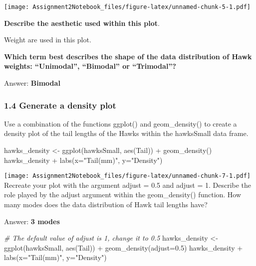 \documentclass[
]{article}
\newenvironment{Shaded}{\begin{snugshade}}{\end{snugshade}}
\newcommand{\AttributeTok}[1]{\textcolor[rgb]{0.77,0.63,0.00}{#1}}
\newcommand{\CommentTok}[1]{\textcolor[rgb]{0.56,0.35,0.01}{\textit{#1}}}
\newcommand{\FloatTok}[1]{\textcolor[rgb]{0.00,0.00,0.81}{#1}}
\newcommand{\FunctionTok}[1]{\textcolor[rgb]{0.00,0.00,0.00}{#1}}
\newcommand{\NormalTok}[1]{#1}
\newcommand{\OtherTok}[1]{\textcolor[rgb]{0.56,0.35,0.01}{#1}}
\newcommand{\SpecialCharTok}[1]{\textcolor[rgb]{0.00,0.00,0.00}{#1}}
\newcommand{\StringTok}[1]{\textcolor[rgb]{0.31,0.60,0.02}{#1}}
\begin{document}
\texttt{[image: Assignment2Notebook\_files/figure-latex/unnamed-chunk-5-1.pdf]}

\textbf{Describe the aesthetic used within this plot}.

Weight are used in this plot.

\textbf{Which term best describes the shape of the data distribution of
Hawk weights: ``Unimodal'', ``Bimodal'' or ``Trimodal''?}

Answer: \textbf{Bimodal}

\hypertarget{generate-a-density-plot}{%
\subsubsection{1.4 Generate a density
plot}\label{generate-a-density-plot}}

Use a combination of the functions ggplot() and geom\_density() to
create a density plot of the tail lengths of the Hawks within the
hawksSmall data frame.

\begin{Shaded}
\begin{Highlighting}[]
\NormalTok{hawks\_density }\OtherTok{\textless{}{-}} \FunctionTok{ggplot}\NormalTok{(hawksSmall, }\FunctionTok{aes}\NormalTok{(Tail)) }\SpecialCharTok{+} \FunctionTok{geom\_density}\NormalTok{()}
\NormalTok{hawks\_density }\SpecialCharTok{+} \FunctionTok{labs}\NormalTok{(}\AttributeTok{x=}\StringTok{"Tail(mm)"}\NormalTok{, }\AttributeTok{y=}\StringTok{"Density"}\NormalTok{)}
\end{Highlighting}
\end{Shaded}

\texttt{[image: Assignment2Notebook\_files/figure-latex/unnamed-chunk-7-1.pdf]}
Recreate your plot with the argument adjust = 0.5 and adjust = 1.
Describe the role played by the adjust argument within the
geom\_density() function. How many modes does the data distribution of
Hawk tail lengths have?

Answer: \textbf{3 modes}

\begin{Shaded}
\begin{Highlighting}[]
\CommentTok{\# The default value of adjust is 1, change it to 0.5}
\NormalTok{hawks\_density }\OtherTok{\textless{}{-}} \FunctionTok{ggplot}\NormalTok{(hawksSmall, }\FunctionTok{aes}\NormalTok{(Tail)) }\SpecialCharTok{+} \FunctionTok{geom\_density}\NormalTok{(}\AttributeTok{adjust=}\FloatTok{0.5}\NormalTok{)}
\NormalTok{hawks\_density }\SpecialCharTok{+} \FunctionTok{labs}\NormalTok{(}\AttributeTok{x=}\StringTok{"Tail(mm)"}\NormalTok{, }\AttributeTok{y=}\StringTok{"Density"}\NormalTok{)}
\end{Highlighting}
\end{Shaded}
\end{document}
